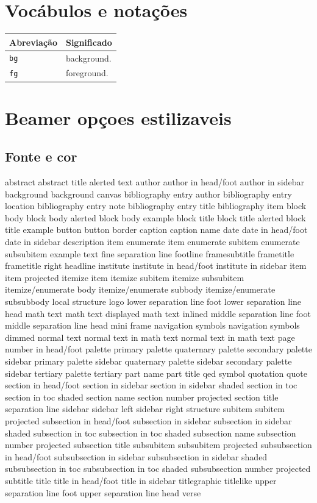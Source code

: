 \documentclass[11pt]{article}
\begin{document}
\section{Vocábulos e notações}
\label{sec:org3962b0e}

\begin{center}
\begin{tabular}{ll}
\hline
Abreviação & Significado\\
\hline
\texttt{bg} & background.\\
\texttt{fg} & foreground.\\
\hline
\end{tabular}
\end{center}

\section{Beamer opçoes estilizaveis}
\label{sec:org03aaff6}
\subsection{Fonte e cor}
\label{sec:org5150e75}
abstract
abstract title
alerted text
author
author in head/foot
author in sidebar
background
background canvas
bibliography entry author
bibliography entry location
bibliography entry note
bibliography entry title
bibliography item
block body
block body alerted
block body example
block title
block title alerted
block title example
button
button border
caption
caption name
date
date in head/foot
date in sidebar
description item
enumerate item
enumerate subitem
enumerate subsubitem
example text
fine separation line
footline
framesubtitle
frametitle
frametitle right
headline
institute
institute in head/foot
institute in sidebar
item
item projected
itemize item
itemize subitem
itemize subsubitem
itemize/enumerate body
itemize/enumerate subbody
itemize/enumerate subsubbody
local structure
logo
lower separation line foot
lower separation line head
math text
math text displayed
math text inlined
middle separation line foot
middle separation line head
mini frame
navigation symbols
navigation symbols dimmed
normal text
normal text in math text
normal text in math text
page number in head/foot
palette primary
palette quaternary
palette secondary
palette sidebar primary
palette sidebar quaternary
palette sidebar secondary
palette sidebar tertiary
palette tertiary
part name
part title
qed symbol
quotation
quote
section in head/foot
section in sidebar
section in sidebar shaded
section in toc
section in toc shaded
section name
section number projected
section title
separation line
sidebar
sidebar left
sidebar right
structure
subitem
subitem projected
subsection in head/foot
subsection in sidebar
subsection in sidebar shaded
subsection in toc
subsection in toc shaded
subsection name
subsection number projected
subsection title
subsubitem
subsubitem projected
subsubsection in head/foot
subsubsection in sidebar
subsubsection in sidebar shaded
subsubsection in toc
subsubsection in toc shaded
subsubsection number projected
subtitle
title
title in head/foot
title in sidebar
titlegraphic
titlelike
upper separation line foot
upper separation line head
verse
\end{document}
